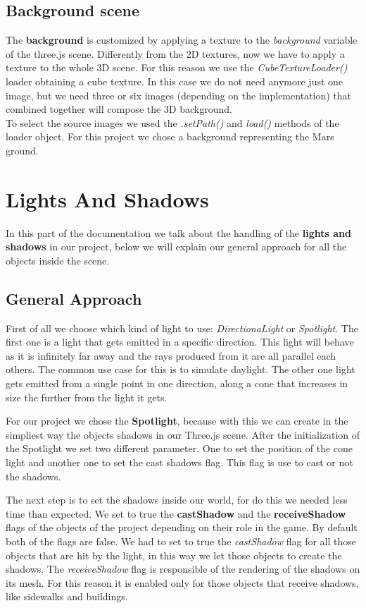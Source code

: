 \documentclass[a4paper, 11pt, titlepage]{report}
\begin{document}
 	\section{Background scene}
		\par The \textbf{background} is customized by applying a texture to the \emph{background} variable of the three.js scene. Differently from the 2D textures, now we have to apply a texture to the whole 3D scene. For this reason we use the \emph{CubeTextureLoader()} loader obtaining a cube texture. In this case we do not need anymore just one image, but we need three or six images (depending on the implementation) that combined together will compose the 3D background. \\
		To select the source images we used the \emph{.setPath()} and \emph{load()} methods of the loader object. For this project we chose a background representing the Mars \cite{backgroundsite} ground.

\chapter{Lights And Shadows}
    \par In this part of the documentation we talk about the handling of the \textbf{lights and shadows} in our project, below we will explain our general approach for all the objects inside the scene. 
 
	\section{General Approach}
   		\par First of all we choose which kind of light to use: \emph{DirectionaLight} or \emph{Spotlight}. The first one is a light that gets emitted in a specific direction. This light will behave as it is infinitely far away and the rays produced from it are all parallel each others. The common use case for this is to simulate daylight. The other one light gets emitted from a single point in one direction, along a cone that increases in size the further from the light it gets.
   		\par For our project we chose the \textbf{Spotlight}, because with this we can create in the simpliest way the objects shadows in our Three.js scene. After the initialization of the Spotlight we set two different parameter. One to set the position of the cone light and another one to set the cast shadows flag. This flag is use to cast or not the shadows. \\
   		\par The next step is to set the shadows inside our world, for do this we needed less time than expected. We set to true the \textbf{castShadow} and the \textbf{receiveShadow} flags of the objects of the project depending on their role in the game. By default both of the flags are false. We had to set to true the \emph{castShadow} flag for all those objects that are hit by the light, in this way we let those objects to create the shadows. The \emph{receiveShadow} flag is responsible of the rendering of the shadows on its mesh. For this reason it is enabled only for those objects that receive shadows, like sidewalks and buildings.
\end{document}
